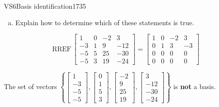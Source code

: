 \begin{exercise}{VS6}{Basis identification}{1735}
\begin{exerciseStatement}
\begin{enumerate}[(a)]
\begin{itemize}
 
\end{itemize}

     
\item  

 Explain how to determine which of these statements is true. 

 
\end{enumerate}

     \end{exerciseStatement}
 \begin{exerciseAnswer} 

 \[
\mathrm{RREF}\, \left[\begin{array}{cccc}
1 & 0 & -2 & 3 \\
-3 & 1 & 9 & -12 \\
-5 & 5 & 25 & -30 \\
-5 & 3 & 19 & -24
\end{array}\right] = \left[\begin{array}{cccc}
1 & 0 & -2 & 3 \\
0 & 1 & 3 & -3 \\
0 & 0 & 0 & 0 \\
0 & 0 & 0 & 0
\end{array}\right]
            \] 

 

 The set of vectors \(\left\{ \left[\begin{array}{c}
1 \\
-3 \\
-5 \\
-5
\end{array}\right] , \left[\begin{array}{c}
0 \\
1 \\
5 \\
3
\end{array}\right] , \left[\begin{array}{c}
-2 \\
9 \\
25 \\
19
\end{array}\right] , \left[\begin{array}{c}
3 \\
-12 \\
-30 \\
-24
\end{array}\right] \right\}\) is \textbf{not} a basis. 

 \end{exerciseAnswer}
 \end{exercise}



